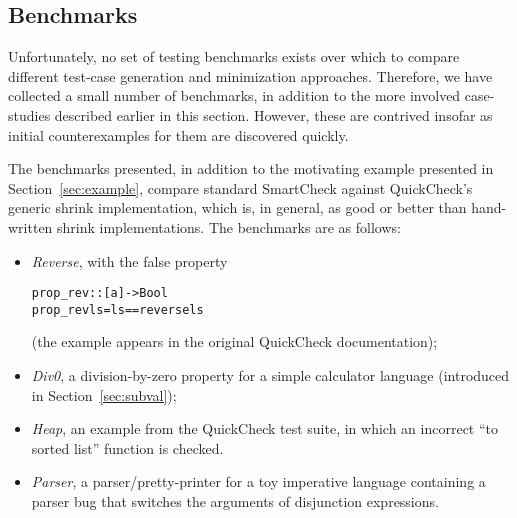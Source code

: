 \documentclass{sigplanconf}
\newenvironment{code}{\begin{alltt}\footnotesize}{\end{alltt}}
\newcommand{\ttp}[1]{\texttt{#1}}
\begin{document}


\subsection{Benchmarks}\label{sec:benchmarks}

Unfortunately, no set of testing benchmarks exists over which to compare
different test-case generation and minimization approaches.  Therefore, we have
collected a small number of benchmarks, in addition to the more involved
case-studies described earlier in this section.  However, these are contrived
insofar as initial counterexamples for them are discovered quickly.

The benchmarks presented, in addition to the motivating example presented in
Section~\ref{sec:example}, compare standard SmartCheck against QuickCheck's
generic shrink implementation, which is, in general, as good or better than
hand-written shrink implementations.  The benchmarks are as follows:

\begin{itemize}
  \item  \emph{Reverse}, with the false property
\begin{code}
prop_rev :: [a] -> Bool
prop_rev ls = ls == reverse ls
\end{code}
\noindent
(the example appears in the original QuickCheck documentation);

  \item \emph{Div0}, a division-by-zero property for a simple calculator
    language (introduced in Section~\ref{sec:subval});

  \item \emph{Heap}, an example from the QuickCheck test suite, in which an
    incorrect ``to sorted list'' function is checked.

  \item \emph{Parser}, a parser/pretty-printer for a toy imperative language
    containing a parser bug that switches the arguments of disjunction
    expressions.
\end{itemize}
\end{document}
